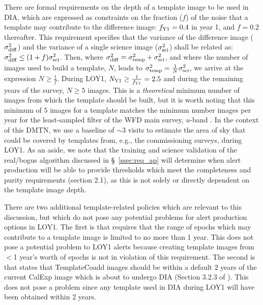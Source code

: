 \documentclass[DM,lsstdraft,toc]{lsstdoc}
\begin{document}
There are formal requirements on the depth of a template image to be used in DIA, which are expressed as constraints on the fraction ($f$) of the noise that a template may contribute to the difference image: $f_{\rm Y1}=0.4$ in year 1, and $f=0.2$ thereafter. This requirement specifies that the variance of the difference image ($\sigma_{\rm diff}^2$) and the variance of a single science image ($\sigma_{\rm sci}^2$) shall be related as: $\sigma_{\rm diff}^2 \leq (1+f)\sigma_{\rm sci}^2$. Then, where $\sigma_{\rm diff}^2 = \sigma_{\rm temp}^2 + \sigma_{\rm sci}^2$, and where the number of images used to build a template, $N$, leads to $\sigma_{\rm temp}^2 = \frac{1}{N} \sigma_{\rm sci}^2$, we arrive at the expression $N \geq \frac{1}{f}$. During LOY1, $N_{\rm Y1} \geq \frac{1}{f_{\rm Y1}} = 2.5$ and during the remaining years of the survey, $N \geq 5$ images. This is a {\em theoretical} minimum number of images from which the template should be built, but it is worth noting that this minimum of $5$ images for a template matches the minimum number images per year for the least-sampled filter of the WFD main survey, $u$-band \citep{Ivezi__2019}. In the context of this DMTN, we use a baseline of $\sim$3 visits to estimate the area of sky that could be covered by templates from, e.g., the commissioning surveys, during LOY1. As an aside, we note that the training and science validation of the real/bogus algorithm discussed in \S~\ref{ssec:req_ap} will determine when alert production will be able to provide thresholds which meet the completeness and purity requirements (section 2.1), as this is not solely or directly dependent on the template image depth.


There are two additional template-related policies which are relevant to this discussion, but which do not pose any potential problems for alert production options in LOY1. The first is that  requires that the range of epochs which may contribute to a template image is limited to no more than 1 year. This does not pose a potential problem to LOY1 alerts because creating template images from $<$1 year's worth of epochs is not in violation of this requirement. The second is that  states that TemplateCoadd images should be within a default $2$ years of the current CalExp image which is about to undergo DIA (Section 3.2.3 of \cite{LDM-151}). This does not pose a problem since any template used in DIA during LOY1 will have been obtained within 2 years.
\end{document}
